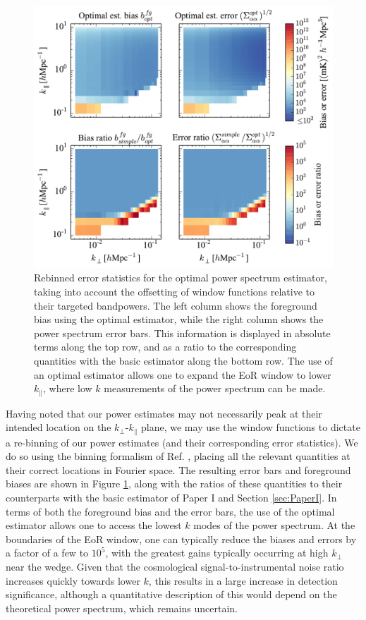 \documentclass[twocolumn,aps,prd,nofootinbib,showpacs]{revtex4-1}
\begin{document}
\begin{figure}[!ht] 
	\centering 
	\includegraphics[width=1.\textwidth]{figures/optBiasAndErrorComparisons.pdf}
	\caption{Rebinned error statistics for the optimal power spectrum estimator, taking into account the offsetting of window functions relative to their targeted bandpowers.  The left column shows the foreground bias using the optimal estimator, while the right column shows the power spectrum error bars.  This information is displayed in absolute terms along the top row, and as a ratio to the corresponding quantities with the basic estimator along the bottom row.  The use of an optimal estimator allows one to expand the EoR window to lower $k_\parallel$, where low $k$ measurements of the power spectrum can be made.}
	\label{fig:optBiasAndErrorComparisons}
\end{figure} 

Having noted that our power estimates may not necessarily peak at their intended location on the $k_\perp$-$k_\parallel$ plane, we may use the window functions to dictate a re-binning of our power estimates (and their corresponding error statistics).  We do so using the binning formalism of Ref. \cite{Dillon2014}, placing all the relevant quantities at their correct locations in Fourier space.  The resulting error bars and foreground biases are shown in Figure \ref{fig:optBiasAndErrorComparisons}, along with the ratios of these quantities to their counterparts with the basic estimator of Paper I and Section \ref{sec:PaperI}.  In terms of both the foreground bias and the error bars, the use of the optimal estimator allows one to access the lowest $k$ modes of the power spectrum.  At the boundaries of the EoR window, one can typically reduce the biases and errors by a factor of a few to $10^5$, with the greatest gains typically occurring at high $k_\perp$ near the wedge.  Given that the cosmological signal-to-instrumental noise ratio increases quickly towards lower $k$, this results in a large increase in detection significance, although a quantitative description of this would depend on the theoretical power spectrum, which remains uncertain.
\end{document}
